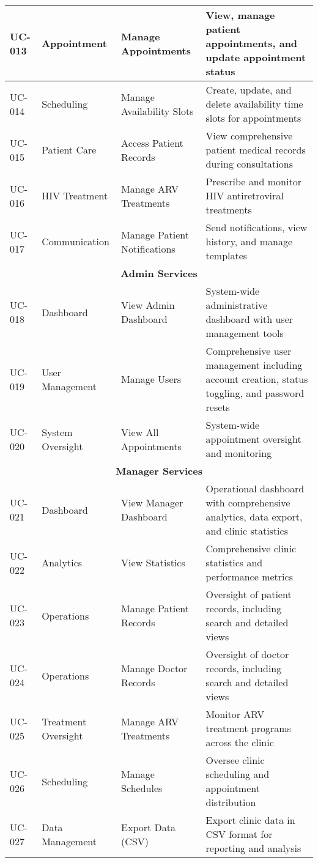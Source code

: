 \documentclass[12pt,a4paper]{article}
\begin{document}
\begin{longtable}{|p{1cm}|p{3cm}|p{3cm}|p{7cm}|}
\hline
UC-013 & Appointment & Manage Appointments & View, manage patient appointments, and update appointment status \\
\hline
UC-014 & Scheduling & Manage Availability Slots & Create, update, and delete availability time slots for appointments \\
\hline
UC-015 & Patient Care & Access Patient Records & View comprehensive patient medical records during consultations \\
\hline
UC-016 & HIV Treatment & Manage ARV Treatments & Prescribe and monitor HIV antiretroviral treatments \\
\hline
UC-017 & Communication & Manage Patient Notifications & Send notifications, view history, and manage templates \\
\hline
\multicolumn{4}{|c|}{\textbf{Admin Services}} \\
\hline
UC-018 & Dashboard & View Admin Dashboard & System-wide administrative dashboard with user management tools \\
\hline
UC-019 & User Management & Manage Users & Comprehensive user management including account creation, status toggling, and password resets \\
\hline
UC-020 & System Oversight & View All Appointments & System-wide appointment oversight and monitoring \\
\hline
\multicolumn{4}{|c|}{\textbf{Manager Services}} \\
\hline
UC-021 & Dashboard & View Manager Dashboard & Operational dashboard with comprehensive analytics, data export, and clinic statistics \\
\hline
UC-022 & Analytics & View Statistics & Comprehensive clinic statistics and performance metrics \\
\hline
UC-023 & Operations & Manage Patient Records & Oversight of patient records, including search and detailed views \\
\hline
UC-024 & Operations & Manage Doctor Records & Oversight of doctor records, including search and detailed views \\
\hline
UC-025 & Treatment Oversight & Manage ARV Treatments & Monitor ARV treatment programs across the clinic \\
\hline
UC-026 & Scheduling & Manage Schedules & Oversee clinic scheduling and appointment distribution \\
\hline
UC-027 & Data Management & Export Data (CSV) & Export clinic data in CSV format for reporting and analysis \\
\hline
\end{longtable}
\end{document}
